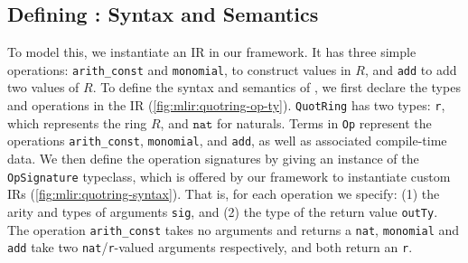 \subsection{Defining \texorpdfstring{}{LeanMLIR(QuotRing)}: Syntax and Semantics}

To model this, we instantiate an IR  in our framework.
It has three simple operations: \texttt{arith\_const} and \texttt{monomial}, to construct values in $R$, and \texttt{add} to add two values of $R$.
To define the syntax and semantics of , we first declare the types and operations in the IR (\cref{fig:mlir:quotring-op-ty}).
\texttt{QuotRing} has two types: \texttt{r}, which represents the ring $R$, and $\texttt{nat}$ for naturals.
Terms in \texttt{Op} represent the operations \texttt{arith\_const}, \texttt{monomial}, and \texttt{add}, as well as associated compile-time data.
We then define the operation signatures by giving an instance of the \texttt{OpSignature} typeclass, which is offered by our framework to instantiate custom IRs (\cref{fig:mlir:quotring-syntax}).
That is, for each operation we specify:
(1) the arity and types of arguments \texttt{sig}, and
(2) the type of the return value \texttt{outTy}.
The operation \texttt{arith\_const} takes no arguments and returns a \texttt{nat}, \texttt{monomial} and \texttt{add} take two \texttt{nat}/\texttt{r}-valued arguments respectively, and both return an \texttt{r}.

